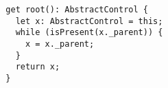 \begin{verbatim}
  get root(): AbstractControl {
    let x: AbstractControl = this;
    while (isPresent(x._parent)) {
      x = x._parent;
    }
    return x;
  }
\end{verbatim}
